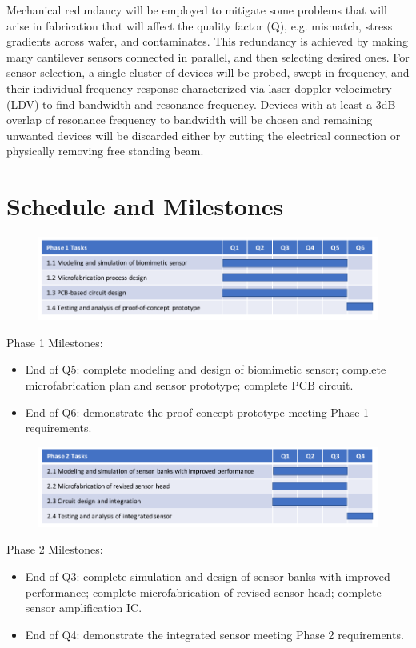 Mechanical redundancy will be employed to mitigate some problems that will arise in fabrication that will affect the quality factor (Q), e.g. mismatch, stress gradients across wafer, and contaminates. This redundancy is achieved by making many cantilever sensors connected in parallel, and then selecting desired ones. For sensor selection, a single cluster of devices will be probed, swept in frequency, and their individual frequency response characterized via laser doppler velocimetry (LDV) to find bandwidth and resonance frequency.  Devices with at least a 3dB overlap of resonance frequency to bandwidth will be chosen and remaining unwanted devices will be discarded either by cutting the electrical connection or physically removing free standing beam.

\section{Schedule and Milestones}

\begin{figure}[H]
\centering
\includegraphics[width=\textwidth]{Gantt1}
\label{fig:gantt1}
\end{figure}
Phase 1 Milestones:
\begin{itemize}
\item End of Q5: complete modeling and design of biomimetic sensor; complete microfabrication plan and sensor prototype;
complete PCB circuit.
\item End of Q6: demonstrate the proof-concept prototype meeting Phase 1 requirements.
\end{itemize}


\begin{figure}[H]
\centering
\includegraphics[width=\textwidth]{Gantt2}
\label{fig:gantt2}
\end{figure}
Phase 2 Milestones:
\begin{itemize}
\item End of Q3: complete simulation and design of sensor banks with improved performance; complete microfabrication
of revised sensor head; complete sensor amplification IC.
\item End of Q4: demonstrate the integrated sensor meeting Phase 2 requirements.
\end{itemize}

